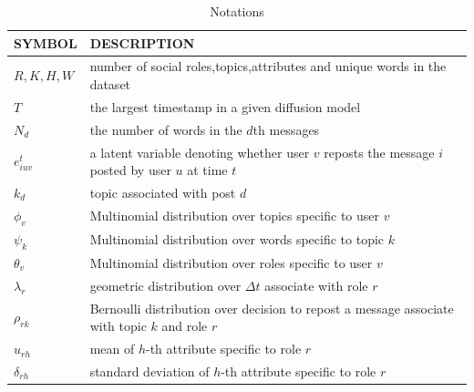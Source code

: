 \documentclass[runningheads,a4paper]{llncs}
\begin{document}
\begin{table}[h]
\centering
\caption{Notations}
  \begin{tabular}{p{2.5cm}<{\centering}|p{9.5cm}<{\centering}}

  \hline
 \bfseries SYMBOL & \bfseries DESCRIPTION  \\
\hline
$R,K,H,W$     & number of social roles,topics,attributes and unique words in the dataset\\
\hline

$T$ & the largest timestamp in a given diffusion model\\
\hline

$N_d$ & the number of words in the $d$th messages\\
\hline

$e_{iuv}^t$  & a latent variable denoting whether user $v$ reposts the message $i$ posted by user $u$ at time $t$\\
\hline
$k_{d}$  & topic associated with post $d$ \\
\hline
${\phi _v}$ & Multinomial distribution over topics specific to user $v$\\
\hline
${\psi _k}$ & Multinomial distribution over words specific to topic $k$ \\
\hline

${\theta _v}$ & Multinomial distribution over roles specific to user $v$\\
\hline
${\lambda _r}$ &  geometric distribution over $\Delta t$ associate with role $r$\\
\hline
${\rho _{rk}}$ &Bernoulli distribution over decision to repost a message associate with topic $k$ and role $r$\\
\hline
${u_{rh}}$  &mean of  $h$-th attribute specific to role $r$\\
\hline
${\delta _{rh}}$ & standard deviation of $h$-th attribute  specific to role $r$ \\
  \hline
\end{tabular}
 \label{notations}

\end{table}
\end{document}

